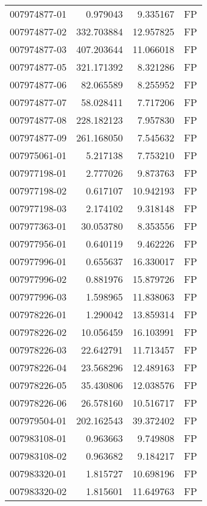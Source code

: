 \begin{tabular}{lrrl}
007974877-01 &    0.979043 &       9.335167 &   FP \\
007974877-02 &  332.703884 &      12.957825 &   FP \\
007974877-03 &  407.203644 &      11.066018 &   FP \\
007974877-05 &  321.171392 &       8.321286 &   FP \\
007974877-06 &   82.065589 &       8.255952 &   FP \\
007974877-07 &   58.028411 &       7.717206 &   FP \\
007974877-08 &  228.182123 &       7.957830 &   FP \\
007974877-09 &  261.168050 &       7.545632 &   FP \\
007975061-01 &    5.217138 &       7.753210 &   FP \\
007977198-01 &    2.777026 &       9.873763 &   FP \\
007977198-02 &    0.617107 &      10.942193 &   FP \\
007977198-03 &    2.174102 &       9.318148 &   FP \\
007977363-01 &   30.053780 &       8.353556 &   FP \\
007977956-01 &    0.640119 &       9.462226 &   FP \\
007977996-01 &    0.655637 &      16.330017 &   FP \\
007977996-02 &    0.881976 &      15.879726 &   FP \\
007977996-03 &    1.598965 &      11.838063 &   FP \\
007978226-01 &    1.290042 &      13.859314 &   FP \\
007978226-02 &   10.056459 &      16.103991 &   FP \\
007978226-03 &   22.642791 &      11.713457 &   FP \\
007978226-04 &   23.568296 &      12.489163 &   FP \\
007978226-05 &   35.430806 &      12.038576 &   FP \\
007978226-06 &   26.578160 &      10.516717 &   FP \\
007979504-01 &  202.162543 &      39.372402 &   FP \\
007983108-01 &    0.963663 &       9.749808 &   FP \\
007983108-02 &    0.963682 &       9.184217 &   FP \\
007983320-01 &    1.815727 &      10.698196 &   FP \\
007983320-02 &    1.815601 &      11.649763 &   FP \\

\end{tabular}
